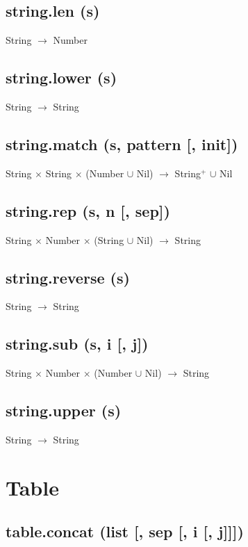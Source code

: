 \documentclass[12pt]{article}
\begin{document}
\subsection{string.len (s)}

String $\rightarrow$ Number

\subsection{string.lower (s)}

String $\rightarrow$ String

\subsection{string.match (s, pattern [, init])}

String $\times$
String $\times$
(Number $\cup$ Nil) $\rightarrow$
String$^+$ $\cup$ Nil

\subsection{string.rep (s, n [, sep])}

String $\times$
Number $\times$
(String $\cup$ Nil) $\rightarrow$
String

\subsection{string.reverse (s)}

String $\rightarrow$ String

\subsection{string.sub (s, i [, j])}

String $\times$
Number $\times$
(Number $\cup$ Nil) $\rightarrow$
String

\subsection{string.upper (s)}

String $\rightarrow$ String

\newpage

\section{Table}

\subsection{table.concat (list [, sep [, i [, j]]])}
\end{document}
